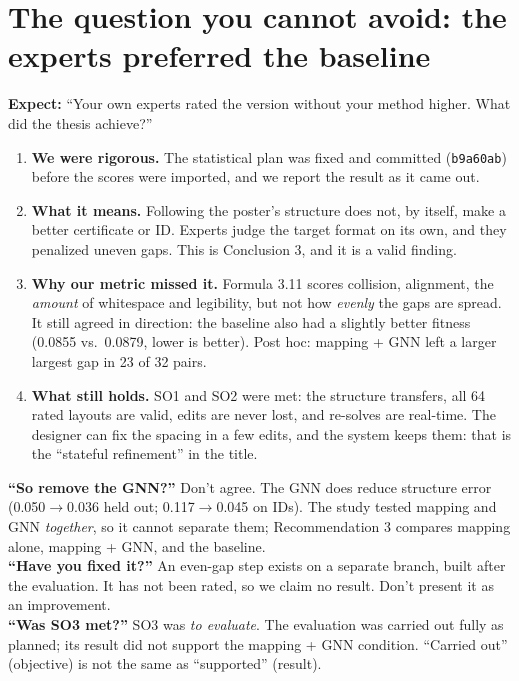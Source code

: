 \documentclass[10pt,a4paper]{article}
\begin{document}
\section{The question you cannot avoid: the experts preferred the baseline}

\textbf{Expect:} ``Your own experts rated the version without your method higher. What did the thesis achieve?''

\begin{key}
\begin{enumerate}
\item \textbf{We were rigorous.} The statistical plan was fixed and committed (\texttt{b9a60ab}) before the scores were imported, and we report the result as it came out.
\item \textbf{What it means.} Following the poster's structure does not, by itself, make a better certificate or ID. Experts judge the target format on its own, and they penalized uneven gaps. This is Conclusion 3, and it is a valid finding.
\item \textbf{Why our metric missed it.} Formula 3.11 scores collision, alignment, the \emph{amount} of whitespace and legibility, but not how \emph{evenly} the gaps are spread. It still agreed in direction: the baseline also had a slightly better fitness (0.0855 vs.\ 0.0879, lower is better). Post hoc: mapping + GNN left a larger largest gap in 23 of 32 pairs.
\item \textbf{What still holds.} SO1 and SO2 were met: the structure transfers, all 64 rated layouts are valid, edits are never lost, and re-solves are real-time. The designer can fix the spacing in a few edits, and the system keeps them: that is the ``stateful refinement'' in the title.
\end{enumerate}
\end{key}

\begin{trap}
\textbf{``So remove the GNN?''} Don't agree. The GNN does reduce structure error (0.050$\to$0.036 held out; 0.117$\to$0.045 on IDs). The study tested mapping and GNN \emph{together}, so it cannot separate them; Recommendation 3 compares mapping alone, mapping + GNN, and the baseline.\\[2pt]
\textbf{``Have you fixed it?''} An even-gap step exists on a separate branch, built after the evaluation. It has not been rated, so we claim no result. Don't present it as an improvement.\\[2pt]
\textbf{``Was SO3 met?''} SO3 was \emph{to evaluate}. The evaluation was carried out fully as planned; its result did not support the mapping + GNN condition. ``Carried out'' (objective) is not the same as ``supported'' (result).
\end{trap}
\end{document}
